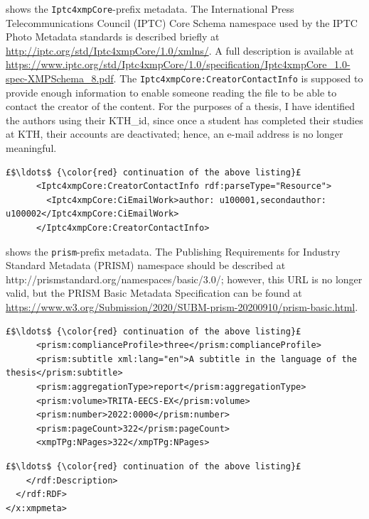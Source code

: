 \documentclass[12pt, twoside]{article}
\begin{document}
 shows the \texttt{Iptc4xmpCore}-prefix metadata. The International Press Telecommunications Council (IPTC) Core Schema namespace used by the IPTC Photo Metadata standards is described briefly at \url{http://iptc.org/std/Iptc4xmpCore/1.0/xmlns/}. A full description is available at \url{https://www.iptc.org/std/Iptc4xmpCore/1.0/specification/Iptc4xmpCore_1.0-spec-XMPSchema_8.pdf}. The \texttt{Iptc4xmpCore:CreatorContactInfo} is supposed to provide enough information to enable someone reading the file to be able to contact the creator of the content. For the purposes of a thesis, I have identified the authors using their KTH\_id, since once a student has completed their studies at KTH, their accounts are deactivated; hence, an e-mail address is no longer meaningful.
\begin{lstlisting}[style=myXML,
caption={{The \texttt{Iptc4xmpCore}-prefix metadata embedded in a PDF file}}, label={lst:pdfinfoOutputPart14}]
£$\ldots$ {\color{red} continuation of the above listing}£ 
      <Iptc4xmpCore:CreatorContactInfo rdf:parseType="Resource">
        <Iptc4xmpCore:CiEmailWork>author: u100001,secondauthor: u100002</Iptc4xmpCore:CiEmailWork>
      </Iptc4xmpCore:CreatorContactInfo>
\end{lstlisting}

 shows the \texttt{prism}-prefix metadata. The Publishing Requirements for Industry Standard Metadata (PRISM) namespace should be described at http://prismstandard.org/namespaces/basic/3.0/; however, this \gls{URL} is no longer valid, but the PRISM Basic Metadata Specification can be found at \url{https://www.w3.org/Submission/2020/SUBM-prism-20200910/prism-basic.html}.
\begin{lstlisting}[style=myXML,
caption={{The \texttt{prism}-prefix metadata embedded in a PDF file}}, label={lst:pdfinfoOutputPart15}]
£$\ldots$ {\color{red} continuation of the above listing}£ 
      <prism:complianceProfile>three</prism:complianceProfile>
      <prism:subtitle xml:lang="en">A subtitle in the language of the thesis</prism:subtitle>
      <prism:aggregationType>report</prism:aggregationType>
      <prism:volume>TRITA-EECS-EX</prism:volume>
      <prism:number>2022:0000</prism:number>
      <prism:pageCount>322</prism:pageCount>
      <xmpTPg:NPages>322</xmpTPg:NPages>
\end{lstlisting}

\begin{lstlisting}[style=myXML,
caption={The final part of the metadata embedded in a PDF file}, label={lst:pdfinfoOutputPart16}]
£$\ldots$ {\color{red} continuation of the above listing}£ 
    </rdf:Description>
  </rdf:RDF>
</x:xmpmeta>
\end{lstlisting}
\end{document}
